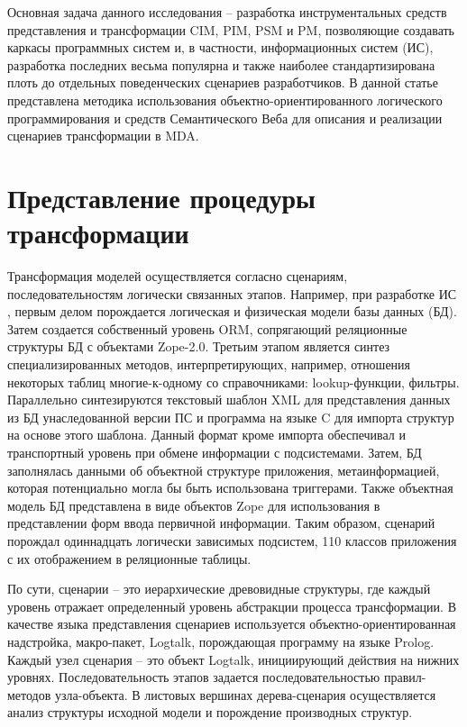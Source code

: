 \documentclass[12pt]{article}
\begin{document}
Основная задача данного исследования -- разработка инструментальных средств представления и трансформации CIM, PIM, PSM и PM, позволяющие создавать каркасы программных систем и, в частности, информационных систем (ИС), разработка последних весьма популярна и также наиболее стандартизирована плоть до отдельных поведенческих сценариев разработчиков.  В данной статье представлена методика использования объектно-ориентированного логического программирования и средств Семантического Веба для описания и реализации сценариев трансформации в MDA.


\section{Представление процедуры трансформации}

Трансформация моделей осуществляется согласно сценариям, последовательностям логически связанных этапов.  Например, при разработке ИС \cite{b2}, первым делом порождается логическая и физическая модели базы данных (БД).  Затем создается собственный уровень ORM, сопрягающий реляционные структуры БД с объектами Zope-2.0.  Третьим этапом является синтез специализированных методов, интерпретирующих, например, отношения некоторых таблиц многие-к-одному со справочниками: lookup-функции, фильтры.  Параллельно синтезируются текстовый шаблон XML для представления данных из БД унаследованной версии ПС и программа на языке C для импорта структур на основе этого шаблона.  Данный формат кроме импорта обеспечивал и транспортный уровень при обмене информации с подсистемами.  Затем, БД заполнялась данными об объектной структуре приложения, метаинформацией, которая потенциально могла бы быть использована триггерами.  Также объектная модель БД представлена в виде объектов Zope для использования в представлении форм ввода первичной информации.  Таким образом, сценарий порождал одиннадцать логически зависимых подсистем, 110 классов приложения с их отображением в реляционные таблицы.

По сути, сценарии -- это иерархические древовидные структуры, где каждый уровень отражает определенный уровень абстракции процесса трансформации.  В качестве языка представления сценариев используется объектно-ориентированная надстройка, макро-пакет, Logtalk, порождающая программу на языке Prolog.  Каждый узел сценария -- это объект Logtalk, инициирующий действия на нижних уровнях.  Последовательность этапов задается последовательностью правил-методов узла-объекта.  В листовых вершинах дерева-сценария осуществляется анализ структуры исходной модели и порождение производных структур.
\end{document}
